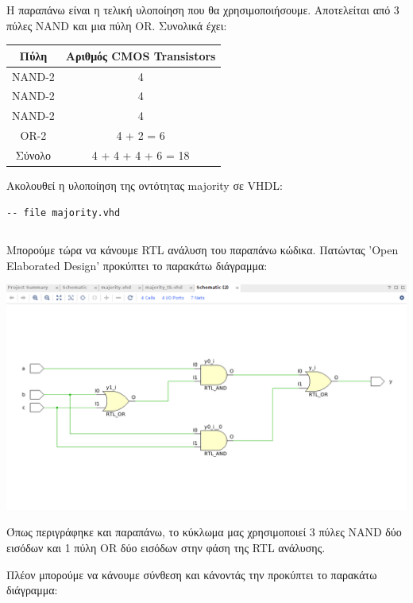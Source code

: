 \documentclass[]{article}
\begin{document}
Η παραπάνω είναι η τελική υλοποίηση που θα χρησιμοποιήσουμε. Αποτελείται από 3 πύλες NAND και μια πύλη OR.
Συνολικά έχει:
\begin{center}
	\begin{tabular}{| c | c |}
		\hline Πύλη   & Αριθμός CMOS Transistors \\
		\hline NAND-2 & 4                        \\
		NAND-2        & 4                        \\
		NAND-2        & 4                        \\
		OR-2          & 4 + 2 = 6                \\
		\hline Σύνολο & 4 + 4 + 4 + 6 = 18       \\
		\hline
	\end{tabular}
\end{center}

Ακολουθεί η υλοποίηση της οντότητας majority σε VHDL:
\begin{verbatim}
-- file majority.vhd
\end{verbatim}
\inputminted{vhdl}{./assign_1/majority.vhdl}

Μπορούμε τώρα να κάνουμε RTL ανάλυση του παραπάνω κώδικα. Πατώντας 'Open Elaborated Design'
προκύπτει το παρακάτω διάγραμμα:

\begin{center}
	\includegraphics[width=\textwidth]{rtl_schem.png}
\end{center}

Όπως περιγράφηκε και παραπάνω, το κύκλωμα μας χρησιμοποιεί 3 πύλες NAND δύο εισόδων και 1 πύλη OR δύο εισόδων στην φάση της RTL ανάλυσης.

\newpage
Πλέον μπορούμε να κάνουμε σύνθεση και κάνοντάς την προκύπτει το παρακάτω διάγραμμα:
\end{document}
